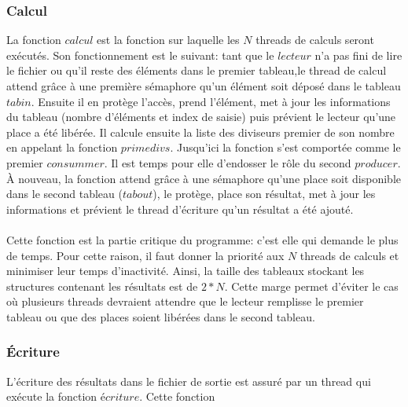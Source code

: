 \documentclass{article}
\begin{document}
\subsubsection{Calcul}
La fonction $calcul$ est la fonction sur laquelle les $N$ threads de calculs seront exécutés. Son fonctionnement est le suivant: tant que le $lecteur$ n'a pas fini de lire le fichier ou qu'il reste des éléments dans le premier tableau,le thread de calcul attend grâce à une première sémaphore qu'un élément soit déposé dans le tableau $tabin$. Ensuite il en protège l'accès, prend l'élément, met à jour les informations du tableau (nombre d'éléments et index de saisie) puis prévient le lecteur qu'une place a été libérée. Il calcule ensuite la liste des diviseurs premier de son nombre en appelant la fonction $primedivs$. Jusqu'ici la fonction s'est comportée comme le premier $consummer$. Il est temps pour elle d'endosser le rôle du second $producer$. À nouveau, la fonction attend grâce à une sémaphore qu'une place soit disponible dans le second tableau ($tabout$), le protège, place son résultat, met à jour les informations et prévient le thread d'écriture qu'un résultat a été ajouté.\\
\\ \danger
Cette fonction est la partie critique du programme: c'est elle qui demande le plus de temps. Pour cette raison, il faut donner la priorité aux $N$ threads de calculs et minimiser leur temps d'inactivité. Ainsi, la taille des tableaux stockant les structures contenant les résultats est de $2*N$. Cette marge permet d'éviter le cas où plusieurs threads devraient attendre que le lecteur remplisse le premier tableau ou que des places soient libérées dans le second tableau.

\subsubsection{Écriture}
L'écriture des résultats dans le fichier de sortie est assuré par un thread qui exécute la fonction $écriture$. Cette fonction 




\end{document}
